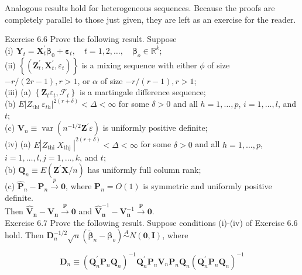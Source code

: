 \documentclass[10pt]{article}
\begin{document}
Analogous results hold for heterogeneous sequences. Because the proofs are completely parallel to those just given, they are left as an exercise for the reader.

Exercise 6.6 Prove the following result. Suppose\\
(i) $\mathbf{Y}_{t}=\mathbf{X}_{t}^{\prime} \boldsymbol{\beta}_{0}+\boldsymbol{\varepsilon}_{t}, \quad t=1,2, \ldots, \quad \boldsymbol{\beta}_{o} \in \mathbb{R}^{k}$;\\
(ii) $\left\{\left(\mathbf{Z}_{t}^{\prime}, \mathbf{X}_{t}^{\prime}, \varepsilon_{t}\right)\right\}$ is a mixing sequence with either $\phi$ of size $-r /(2 r- 1), r>1$, or $\alpha$ of size $-r /(r-1), r>1$;\\
(iii) (a) $\left\{\mathbf{Z}_{t} \varepsilon_{t}, \mathcal{F}_{t}\right\}$ is a martingale difference sequence;\\
(b) $E\left|Z_{\text {thi }} \varepsilon_{t h}\right|^{2(r+\delta)}<\Delta<\infty$ for some $\delta>0$ and all $h=1, \ldots, p$, $i=1, \ldots, l$, and $t$;\\
(c) $\mathbf{V}_{n} \equiv \operatorname{var}\left(n^{-1 / 2} \mathbf{Z}^{\prime} \varepsilon\right)$ is uniformly positive definite;\\
(iv) (a) $E\left|Z_{\text {thi }} X_{\text {thj }}\right|^{2(r+\delta)}<\Delta<\infty$ for some $\delta>0$ and all $h=1, \ldots, p$, $i=1, \ldots, l, j=1, \ldots, k$, and $t$;\\
(b) $\mathbf{Q}_{n} \equiv E\left(\mathbf{Z}^{\prime} \mathbf{X} / n\right)$ has uniformly full column rank;\\
(c) $\hat{\mathbf{P}}_{n}-\mathbf{P}_{n} \xrightarrow{p} \mathbf{0}$, where $\mathbf{P}_{n}=O(1)$ is symmetric and uniformly positive definite.\\
Then $\hat{\mathbf{V}}_{\boldsymbol{n}}-\mathbf{V}_{\boldsymbol{n}} \xrightarrow{\boldsymbol{p}} \mathbf{0}$ and $\hat{\mathbf{V}}_{\boldsymbol{n}}^{-1}-\mathbf{V}_{\boldsymbol{n}}^{-1} \xrightarrow{\boldsymbol{p}} \mathbf{0}$.\\
Exercise 6.7 Prove the following result. Suppose conditions (i)-(iv) of Exercise 6.6 hold. Then $\mathbf{D}_{n}^{-1 / 2} \sqrt{n}\left(\tilde{\boldsymbol{\beta}}_{n}-\boldsymbol{\beta}_{o}\right) \stackrel{A}{\sim} N(\mathbf{0}, \mathbf{I})$, where

$$
\mathbf{D}_{n} \equiv\left(\mathbf{Q}_{n}^{\prime} \mathbf{P}_{n} \mathbf{Q}_{n}\right)^{-1} \mathbf{Q}_{n}^{\prime} \mathbf{P}_{n} \mathbf{V}_{n} \mathbf{P}_{n} \mathbf{Q}_{n}\left(\mathbf{Q}_{n}^{\prime} \mathbf{P}_{n} \mathbf{Q}_{n}\right)^{-1}
$$
\end{document}
